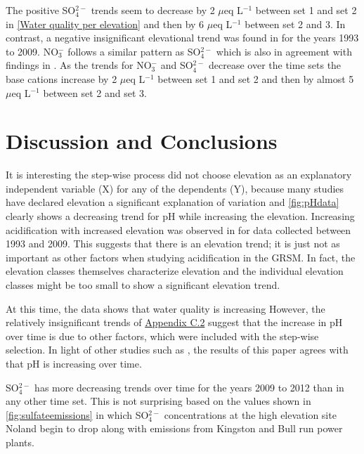The positive SO$_4^{2-}$ trends seem to decrease by 2 $\mu$eq L$^{-1}$ between set 1 and set 2 in \autoref{Water quality per elevation} and then by 6  $\mu$eq L$^{-1}$ between set 2 and 3.  
In contrast, a negative insignificant elevational trend was found in \citet{cai2013} for the years 1993 to 2009.  
NO$_3^-$ follows a similar pattern as SO$_4^{2-}$ which is also in agreement with findings in \citet{weathers2006}.  
As the trends for  NO$_3^-$ and SO$_4^{2-}$ decrease over the time sets the base cations increase by 2 $\mu$eq L$^{-1}$ between set 1 and set 2 and then by almost 5 $\mu$eq L$^{-1}$ between set 2 and set 3.

\section{Discussion and Conclusions}

It is interesting the step-wise process did not choose elevation as an explanatory independent variable (X) for any of the dependents (Y), because many studies have declared elevation a significant explanation of variation and \autoref{fig:pHdata} clearly shows a decreasing trend for pH while increasing the elevation. 
Increasing acidification with increased elevation was observed in \citet{cai2013} for data collected between 1993 and 2009.
This suggests that there is an elevation trend; it is just not as important as other factors when studying acidification in the GRSM.
In fact, the elevation classes themselves characterize elevation and the individual elevation classes might be too small to show a significant elevation trend.  

At this time, the data shows that water quality is increasing
However, the relatively insignificant trends of  \hyperref[sec:TVJD]{Appendix C.2} suggest that the increase in pH over time is due to other factors, which were included with the step-wise selection. 
In light of other studies such as \citet{robinson2008ph}, the results of this paper agrees with \citet{cai2013} that pH is increasing over time.

SO$_4^{2-}$ has more decreasing trends over time for the years 2009 to 2012 than in any other time set.
This is not surprising based on the values shown in \autoref{fig:sulfateemissions} in which SO$_4^{2-}$ concentrations at the high elevation site Noland begin to drop along with emissions from Kingston and Bull run power plants.  

